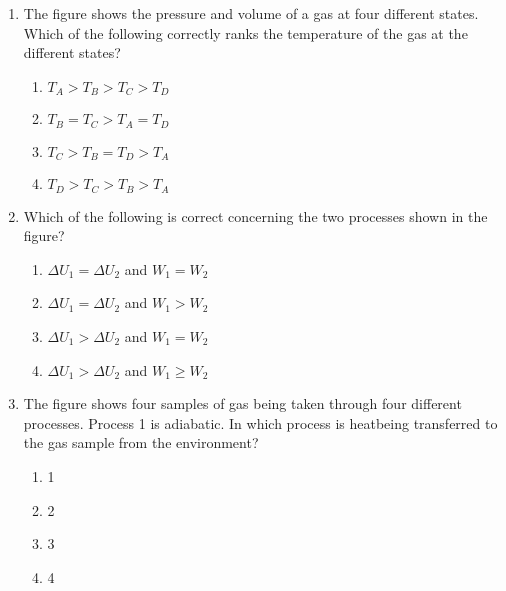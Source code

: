 \documentclass{../../oss-apphys}
\begin{document}
\begin{multicols}{2}
\begin{enumerate}[leftmargin=18pt,start=3]
  \item The figure shows the pressure and volume of a gas at four different
    states. Which of the following correctly ranks the temperature of the
    gas at the different states?
    \begin{enumerate}[noitemsep,topsep=0pt,leftmargin=18pt,label=(\Alph*)]
    \item $T_A > T_B > T_C > T_D$
    \item $T_B = T_C > T_A = T_D$
    \item $T_C > T_B = T_D > T_A$
    \item $T_D > T_C > T_B > T_A$
    \end{enumerate}
  
  \item Which of the following is correct concerning the two processes shown
    in the figure?
    \begin{enumerate}[noitemsep,topsep=0pt,leftmargin=18pt,label=(\Alph*)]
    \item $\Delta U_1 = \Delta U_2$ and $W_1= W_2$
    \item $\Delta U_1 = \Delta U_2$ and $W_1>W_2$
    \item $\Delta U_1 > \Delta U_2$ and $W_1=W_2$
    \item $\Delta U_1 > \Delta U_2$ and $W_1\geq W_2$
    \end{enumerate}
  
  \item The figure shows four samples of gas being taken through four
    different processes. Process 1 is adiabatic. In which process is heatbeing
    transferred to the gas sample from the environment?
    \begin{enumerate}[noitemsep,topsep=0pt,leftmargin=18pt,label=(\Alph*)]
    \item\num{1}
    \item\num{2}
    \item\num{3}
    \item\num{4}
    \end{enumerate}


\end{enumerate}
\end{multicols}
\end{document}
